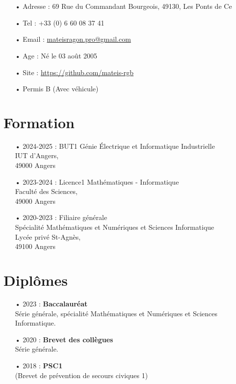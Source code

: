 \documentclass[french]{article}
\begin{document}
\RaggedRight

\section*{}

\begin{itemize}
	\item[•] Adresse : 69 Rue du Commandant Bourgeois, 49130, Les Ponts de Ce
	\item[•] Tel : +33 (0) 6 60 08 37 41
	\item[•] Email : \href{mailto:mateisragon.pro@gmail.com}{mateisragon.pro@gmail.com}
	\item[•] Age : Né le 03 août 2005
	\item[•] Site : \href{https://https://github.com/mateis-rgb}{https://github.com/mateis-rgb}
	\item[•]  Permis B (Avec véhicule)
\end{itemize}
	
\section*{Formation}
\begin{itemize}
	\item[• 2024-2025 :] BUT1 Génie Électrique et Informatique Industrielle \\ IUT d'Angers, \\ 49000 Angers

	\item[• 2023-2024 :] Licence1 Mathématiques - Informatique \\ Faculté des Sciences, \\ 49000 Angers
	
	\item[• 2020-2023 :] Filiaire générale \\ Spécialité Mathématiques et Numériques et Sciences Informatique \\ Lycée privé St-Agnès, \\ 49100 Angers
\end{itemize}

\section*{Diplômes}
\begin{itemize}
	\item[• 2023 :] \textbf{Baccalauréat} \\ Série générale, spécialité Mathématiques et Numériques et Sciences Informatique.
	
	\item[• 2020 :] \textbf{Brevet des collègues} \\ Série générale.

	\item[• 2018 :] \textbf{PSC1} \\ (Brevet de prévention de secours civiques 1)
\end{itemize}
\end{document}
